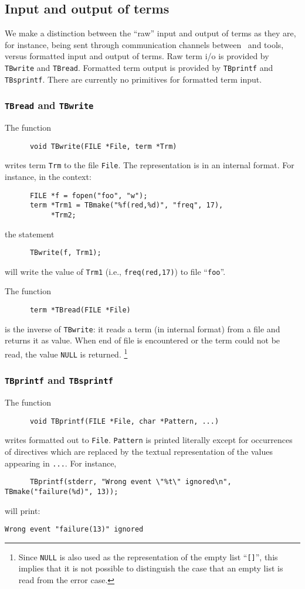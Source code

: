 \subsection{\label{TermIO}Input and output of terms}
We make a distinction between the ``raw'' input and output of terms
as they are, for instance, being sent through communication
channels between \TB\ and tools, versus formatted input and output
of terms. Raw term i/o is provided by {\tt TBwrite} and {\tt TBread}.
Formatted term output is provided by {\tt TBprintf} and {\tt TBsprintf}.
There are currently no primitives for formatted term input.

\subsubsection{\label{TBread/write}{\tt TBread} and {\tt TBwrite}}
The function
\begin{verbatim}
      void TBwrite(FILE *File, term *Trm)
\end{verbatim}
writes term {\tt Trm} to the file {\tt File}. The representation is
in an internal format.
For instance, in the context:
\begin{verbatim}
      FILE *f = fopen("foo", "w");
      term *Trm1 = TBmake("%f(red,%d)", "freq", 17),
           *Trm2;
\end{verbatim}
the statement
\begin{verbatim}
      TBwrite(f, Trm1);
\end{verbatim}
will write the value of {\tt Trm1} (i.e., {\tt freq(red,17)})
to file ``{\tt foo}''.

The function
\begin{verbatim}
      term *TBread(FILE *File)
\end{verbatim}
is the inverse of {\tt TBwrite}: it reads a term (in internal format) from
a file and returns it as value. When end of file is encountered or
the term could not be read, the value {\tt NULL} is returned.
\footnote{Since {\tt NULL} is also used as the representation of the empty list
``{\tt []}'', this implies that it is not possible to distinguish the
case that an empty list is read from the error case.}

\subsubsection{\label{TBprintf}{\tt TBprintf} and {\tt TBsprintf}}
The function
\begin{verbatim}
      void TBprintf(FILE *File, char *Pattern, ...)
\end{verbatim}
writes formatted out to {\tt File}.
{\tt Pattern} is printed literally except for occurrences
of directives which are replaced by the textual representation
of the values appearing in {\tt ...}. For instance,
\begin{verbatim}
      TBprintf(stderr, "Wrong event \"%t\" ignored\n", TBmake("failure(%d)", 13));
\end{verbatim}
will print:
\begin{verbatim}
Wrong event "failure(13)" ignored
\end{verbatim}

